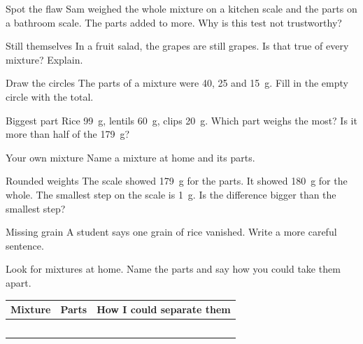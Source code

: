 \begin{puzzle}{Spot the flaw}
Sam weighed the whole mixture on a kitchen scale and the parts on a bathroom scale. The parts added to more. Why is this test not trustworthy? \wline[6cm]
\end{puzzle}

\begin{puzzle}{Still themselves}
In a fruit salad, the grapes are still grapes. Is that true of every mixture? Explain. \wline[6cm]
\end{puzzle}

\clearpage

\begin{puzzle}{Draw the circles}
The parts of a mixture were 40, 25 and 15~g. Fill in the empty circle with the total.
\begin{center}
\end{center}
\end{puzzle}

\begin{puzzle}{Biggest part}
Rice 99~g, lentils 60~g, clips 20~g. Which part weighs the most? \wline[2cm] Is it more than half of the 179~g? \wline[2cm]
\end{puzzle}

\begin{puzzle}{Your own mixture}
Name a mixture at home and its parts.\\
\wline[9cm]
\end{puzzle}

\begin{puzzle}{Rounded weights}
The scale showed 179~g for the parts. It showed 180~g for the whole. The smallest step on the scale is 1~g. Is the difference bigger than the smallest step? \wline[2cm]
\end{puzzle}

\begin{puzzle}{Missing grain}
A student says one grain of rice vanished. Write a more careful sentence. \wline[6cm]
\end{puzzle}
\clearpage
\thispagestyle{fancy}
Look for mixtures at home. Name the parts and say how you could take them apart.\par\medskip
\renewcommand{\arraystretch}{3.0}
\begin{tabularx}{\linewidth}{|>{\sffamily\small\bfseries}p{2.6cm}|X|X|}
\hline
Mixture & Parts & How I could separate them \\ \hline
 & & \\ \hline
 & & \\ \hline
 & & \\ \hline
 & & \\ \hline
 & & \\ \hline
\end{tabularx}
\clearpage

